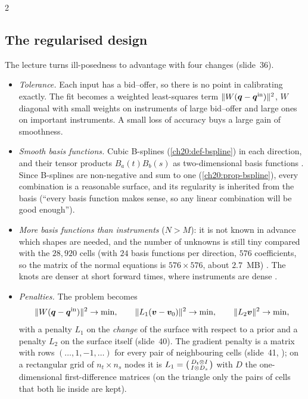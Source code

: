 \begin{paracol}{2}
\subsection{The regularised design}\label{ch20:sec-volsolve}
The lecture turns ill-posedness to advantage with four changes  (slide~36).
\begin{itemize}
  \item \emph{Tolerance.} Each input has a bid--offer, so there is no point in calibrating exactly. The fit becomes a weighted least-squares term $\|W(\bm q-\bm q^{\rm in})\|^2$, $W$ diagonal with small weights on instruments of large bid--offer and large ones on important instruments. A
        small loss of accuracy buys a large gain of smoothness.
  \item \emph{Smooth basis functions.} Cubic B-splines (\cref{ch20:def-bspline}) in each direction, and their tensor products $B_a(t)B_b(s)$ as two-dimensional basis functions . Since B-splines are non-negative and sum to one (\cref{ch20:prop-bspline}), every combination is a
        reasonable surface, and its regularity is inherited from the basis (``every basis function makes sense, so any linear combination will be good enough'').
  \item \emph{More basis functions than instruments} ($N>M$): it is not known in advance which shapes are needed, and the number of unknowns is still tiny compared with the $28{,}920$ cells (with $24$ basis functions per direction, $576$ coefficients, so the matrix of the normal equations is $576\times576$, about $2.7$~MB) .
        The knots are denser at short forward times, where instruments are dense .
  \item \emph{Penalties.} The problem becomes 
        \begin{equation}\label{ch20:eq-volpen}
          \|W(\bm q-\bm q^{\rm in})\|^2\to\min,\qquad \|L_1(\bm v-\bm v_0)\|^2\to\min,\qquad \|L_2\bm v\|^2\to\min ,
        \end{equation}
        with a penalty $L_1$ on the \emph{change} of the surface with respect to a prior and a penalty $L_2$ on the surface itself (slide~40). The gradient penalty is a matrix with rows $(\dots,1,-1,\dots)$ for every pair of neighbouring cells (slide~41, ); on a rectangular
        grid of $n_t\times n_s$ nodes it is $L_1=\begin{psmallmatrix}D_t\otimes I\\ I\otimes D_s\end{psmallmatrix}$ with $D$ the one-dimensional first-difference matrices (on the triangle only the pairs of cells that both lie inside are kept).
\end{itemize}


\end{paracol}
